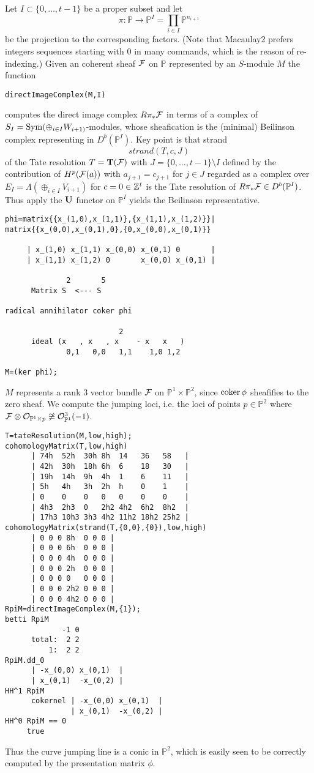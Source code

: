 \documentclass[twoside,12pt, leqno]{amsart}
\def\PP{{\mathbb P}}
\def\bT{{\bf T}}
\def\bU{{\bf U}}
\begin{document}
Let $I \subset \{0,\ldots,t-1 \}$ be a proper subset and let
$$ \pi \colon\PP \to  \PP^I=\prod_{i \in  I} \PP^{n_{i+1}}$$
be the projection to the corresponding factors. (Note that Macaulay2 prefers integers sequences starting with $0$ in many commands, which is the reason of re-indexing.) Given an coherent sheaf ${\mathcal F}$ on $\PP$ represented by an $S$-module $M$
the function
\begin{verbatim}
directImageComplex(M,I)
\end{verbatim}
computes the direct image complex $R\pi_* {\mathcal F}$ in terms of a complex of $S_I = \operatorname{Sym} (\oplus_{i \in I} W_{i+1)}$-modules, whose sheafication
is the (minimal) Beilinson complex representing in $D^b(\PP^I)$. Key point is that  strand
$$strand(T,c,J)$$
of the Tate resolution $T=\bT(\sF)$ with $J=\{0,\ldots,t-1\} \setminus I$ defined by the contribution of $H^p({\mathcal F}(a))$ with $a_{j+1}=c_{j+1}$ for $j \in J$ regarded as a complex over $E_I= \Lambda( \oplus_{i\in I} V_{i+1})$ for $c=0 \in {\mathbb Z}^t$ is the Tate resolution of $R\pi_* \sF \in D^b(\PP^I)$.
Thus apply the $\bU$ functor on $\PP^I$ yields the Beilinson representative.
{\small \begin{verbatim}
phi=matrix{{x_(1,0),x_(1,1)},{x_(1,1),x_(1,2)}}|
matrix{{x_(0,0),x_(0,1),0},{0,x_(0,0),x_(0,1)}}

     | x_(1,0) x_(1,1) x_(0,0) x_(0,1) 0       |
     | x_(1,1) x_(1,2) 0       x_(0,0) x_(0,1) |

              2       5
      Matrix S  <--- S

radical annihilator coker phi

                          2
      ideal (x   , x   , x    - x   x   )
              0,1   0,0   1,1    1,0 1,2

M=(ker phi);
\end{verbatim}}
$M$ represents a rank 3 vector bundle ${\mathcal F}$ on $\PP^1\times \PP^2$, since  ${\rm{coker}\,} \phi$ sheafifies to the zero sheaf. We compute the jumping loci, i.e. the loci of points $p \in \PP^2$ where $\sF\otimes \sO_{\PP^1\times p} \not\cong \sO_{\PP^1}^3(-1)$.
{\small \begin{verbatim}
T=tateResolution(M,low,high); 
cohomologyMatrix(T,low,high)
      | 74h  52h  30h 8h  14   36   58   |
      | 42h  30h  18h 6h  6    18   30   |
      | 19h  14h  9h  4h  1    6    11   |
      | 5h   4h   3h  2h  h    0    1    |
      | 0    0    0   0   0    0    0    |
      | 4h3  2h3  0   2h2 4h2  6h2  8h2  |
      | 17h3 10h3 3h3 4h2 11h2 18h2 25h2 |
cohomologyMatrix(strand(T,{0,0},{0}),low,high)
      | 0 0 0 8h  0 0 0 |
      | 0 0 0 6h  0 0 0 |
      | 0 0 0 4h  0 0 0 |
      | 0 0 0 2h  0 0 0 |
      | 0 0 0 0   0 0 0 |
      | 0 0 0 2h2 0 0 0 |
      | 0 0 0 4h2 0 0 0 | 
RpiM=directImageComplex(M,{1});
betti RpiM
             -1 0
      total:  2 2
          1:  2 2
RpiM.dd_0
      | -x_(0,0) x_(0,1)  |
      | x_(0,1)  -x_(0,2) |
HH^1 RpiM
      cokernel | -x_(0,0) x_(0,1)  |
               | x_(0,1)  -x_(0,2) |
HH^0 RpiM == 0 
     true 
 \end{verbatim}}
Thus the curve jumping line is a conic in $\PP^2$, which is easily seen to be correctly computed by the presentation matrix $\phi$.
\end{document}

